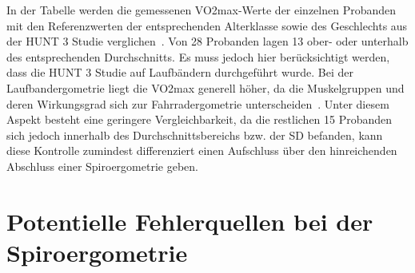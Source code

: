 %
In der Tabelle werden die gemessenen \gls{VO2max}-Werte der einzelnen Probanden mit den Referenzwerten der entsprechenden Alterklasse sowie des Geschlechts aus der HUNT 3 Studie verglichen~\cite{Loe.2014}. Von 28 Probanden lagen 13 ober- oder unterhalb des entsprechenden Durchschnitts. Es muss jedoch hier berücksichtigt werden, dass die HUNT 3 Studie auf Laufbändern durchgeführt wurde. Bei der Laufbandergometrie liegt die \gls{VO2max} generell höher, da die Muskelgruppen und deren Wirkungsgrad sich zur Fahrradergometrie unterscheiden~\cite{Kroidl.2015}. Unter diesem Aspekt besteht eine geringere Vergleichbarkeit, da die restlichen 15 Probanden sich jedoch innerhalb des Durchschnittsbereichs bzw. der \gls{SD} befanden, kann diese Kontrolle zumindest differenziert einen Aufschluss über den hinreichenden Abschluss einer Spiroergometrie geben. 
%
\section{Potentielle Fehlerquellen bei der Spiroergometrie}
%
